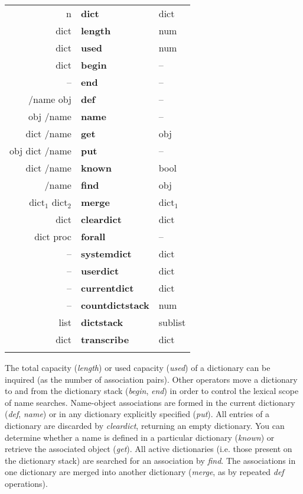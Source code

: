 \begin{tabular}{>{\sffamily}r>{\sffamily\bfseries}l>{\sffamily}l}
n & dict & dict\\
dict & length & num\\
dict & used & num\\
dict & begin & --\\
-- & end & --\\
/name obj & def & --\\
obj /name & name & --\\
dict /name & get & obj\\
obj dict /name & put & --\\
dict /name & known & bool\\
/name & find & obj\\
dict$_1$ dict$_2$ & merge & dict$_1$\\
dict & cleardict & dict \\
dict proc & forall & --\\
-- & systemdict & dict\\
-- & userdict & dict\\
-- & currentdict & dict\\
-- & countdictstack & num\\
list & dictstack & sublist\\
dict & transcribe & dict\\\\
\end{tabular}



The  total capacity (\emph{length}) or used capacity (\emph{used}) of a dictionary  can be inquired (as the number of association pairs). Other operators move  a dictionary  to  and from the dictionary stack (\emph{begin}, \emph{end})  in  order  to control  the lexical scope of name searches. Name-object associations are formed in the current dictionary (\emph{def},  \emph{name}) or  in  any  dictionary  explicitly  specified  (\emph{put}). All entries of a dictionary are discarded by \emph{cleardict}, returning an empty dictionary. You  can determine  whether a name is defined  in  a  particular dictionary (\emph{known}) or retrieve the associated object (\emph{get}). All active dictionaries (i.e. those present on the dictionary stack) are searched for an  association  by \emph{find}.  The associations in one dictionary are merged into another dictionary (\emph{merge}, as  by repeated \emph{def} operations). 


